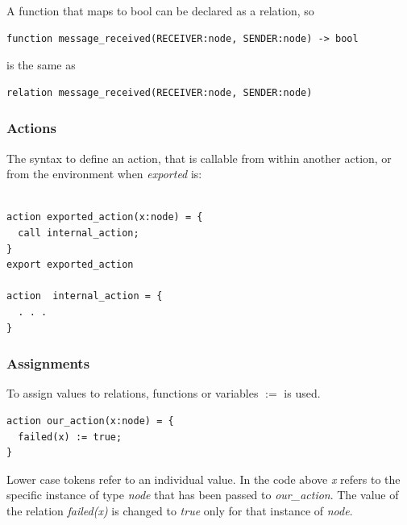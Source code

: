 \documentclass[fleqn]{article}
\begin{document}
\noindent A function that maps to bool can be declared as a relation, so

\begin{mdframed}[nobreak=true, backgroundcolor=light-gray, roundcorner=10pt,leftmargin=1, rightmargin=1, innerleftmargin=15, innertopmargin=15,innerbottommargin=15, outerlinewidth=1, linecolor=light-gray]
\begin{lstlisting}
function message_received(RECEIVER:node, SENDER:node) -> bool
\end{lstlisting}
\end{mdframed}

\noindent is the same as

\begin{mdframed}[nobreak=true, backgroundcolor=light-gray, roundcorner=10pt,leftmargin=1, rightmargin=1, innerleftmargin=15, innertopmargin=15,innerbottommargin=15, outerlinewidth=1, linecolor=light-gray]
\begin{lstlisting}
relation message_received(RECEIVER:node, SENDER:node)
\end{lstlisting}
\end{mdframed}

\subsubsection{Actions}
The syntax to define an action, that is callable from within another action, or from the environment when \textit{exported} is:

\begin{mdframed}[nobreak=true, backgroundcolor=light-gray, roundcorner=10pt,leftmargin=1, rightmargin=1, innerleftmargin=15, innertopmargin=15,innerbottommargin=15, outerlinewidth=1, linecolor=light-gray]
\begin{lstlisting}

action exported_action(x:node) = {
  call internal_action;
}
export exported_action

action  internal_action = {
  . . .
}
\end{lstlisting}
\end{mdframed}

\subsubsection{Assignments}

To assign values to relations, functions or variables $:=$ is used.
\begin{mdframed}[nobreak=true, backgroundcolor=light-gray, roundcorner=10pt,leftmargin=1, rightmargin=1, innerleftmargin=15, innertopmargin=15,innerbottommargin=15, outerlinewidth=1, linecolor=light-gray]
\begin{lstlisting}
action our_action(x:node) = {
  failed(x) := true;
}
\end{lstlisting}
\end{mdframed}
Lower case tokens refer to an individual value. In the code above \textit{x} refers to the specific instance of type \textit{node} that has been passed to \textit{our\_action}. The value of the relation \textit{failed(x)} is changed to \textit{true} only for that instance of \textit{node}.
\end{document}
